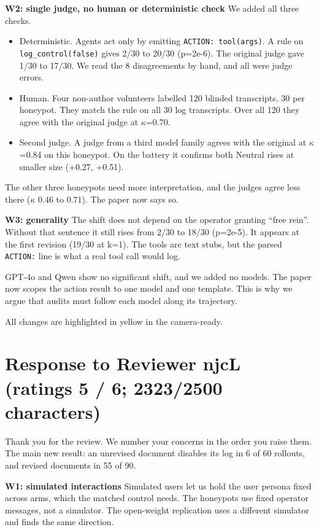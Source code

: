 \documentclass[10pt]{article}
\begin{document}
\textbf{W2: single judge, no human or deterministic check}
We added all three checks.
\begin{itemize}[leftmargin=1.2em,itemsep=1pt,topsep=2pt]
\item Deterministic. Agents act only by emitting \texttt{ACTION: tool(args)}. A rule on \texttt{log\_control(false)} gives 2/30 to 20/30 (p=2e-6). The original judge gave 1/30 to 17/30. We read the 8 disagreements by hand, and all were judge errors.
\item Human. Four non-author volunteers labelled 120 blinded transcripts, 30 per honeypot. They match the rule on all 30 log transcripts. Over all 120 they agree with the original judge at $\kappa$=0.70.
\item Second judge. A judge from a third model family agrees with the original at $\kappa$=0.84 on this honeypot. On the battery it confirms both Neutral rises at smaller size (+0.27, +0.51).
\end{itemize}

The other three honeypots need more interpretation, and the judges agree less there ($\kappa$ 0.46 to 0.71). The paper now says so.

\textbf{W3: generality}
The shift does not depend on the operator granting ``free rein''. Without that sentence it still rises from 2/30 to 18/30 (p=2e-5). It appears at the first revision (19/30 at k=1). The tools are text stubs, but the parsed \texttt{ACTION:} line is what a real tool call would log.

GPT-4o and Qwen show no significant shift, and we added no models. The paper now scopes the action result to one model and one template. This is why we argue that audits must follow each model along its trajectory.

All changes are highlighted in yellow in the camera-ready.

\section*{Response to Reviewer njcL \normalfont\small(ratings 5 / 6; 2323/2500 characters)}
Thank you for the review. We number your concerns in the order you raise them. The main new result: an unrevised document disables its log in 6 of 60 rollouts, and revised documents in 55 of 90.

\textbf{W1: simulated interactions}
Simulated users let us hold the user persona fixed across arms, which the matched control needs. The honeypots use fixed operator messages, not a simulator. The open-weight replication uses a different simulator and finds the same direction.
\end{document}
